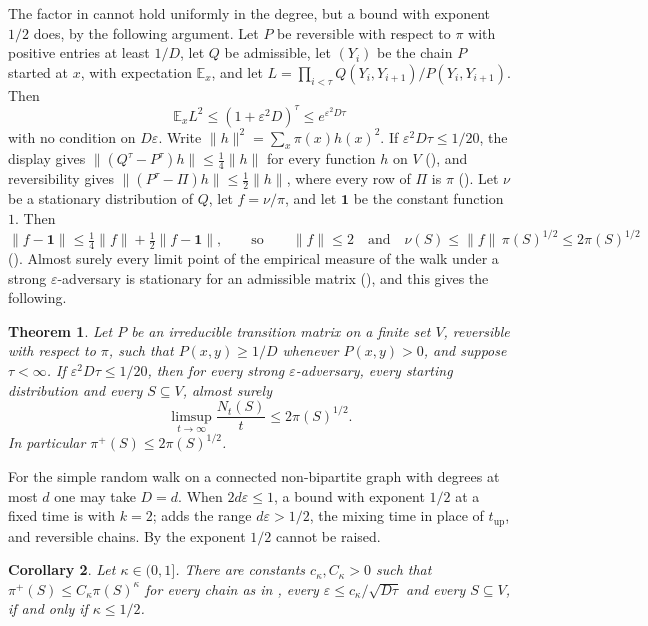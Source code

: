 \documentclass[11pt]{article}
\newtheorem{theorem}{Theorem}
\newtheorem{corollary}[theorem]{Corollary}
\theoremstyle{remark}
\theoremstyle{plain}
\newcommand{\tup}{t_{\mathrm{up}}}
\begin{document}
The factor in  cannot hold uniformly in the degree, but a bound with exponent $1/2$ does, by the following
argument.
Let $P$ be reversible with respect to $\pi$ with positive entries at least $1/D$, let $Q$ be admissible, let $(Y_i)$
be the chain $P$ started at $x$, with expectation $\mathbb E_x$, and let
$L=\prod_{i<\tau}Q(Y_i,Y_{i+1})/P(Y_i,Y_{i+1})$. Then
\[
\mathbb E_xL^2\le(1+\varepsilon^2D)^\tau\le e^{\varepsilon^2D\tau}
\]
with no condition on $D\varepsilon$. Write $\|h\|^2=\sum_x\pi(x)h(x)^2$. If $\varepsilon^2D\tau\le1/20$, the display
gives $\|(Q^\tau-P^\tau)h\|\le\frac14\|h\|$ for every function $h$ on $V$ (), and reversibility gives
$\|(P^\tau-\Pi)h\|\le\frac12\|h\|$, where every row of $\Pi$ is $\pi$ (). Let $\nu$ be a stationary
distribution of $Q$, let $f=\nu/\pi$, and let $\mathbf 1$ be the constant function $1$. Then
\[
\|f-\mathbf 1\|\le\tfrac14\|f\|+\tfrac12\|f-\mathbf 1\|,\qquad\text{so}\qquad\|f\|\le2\quad\text{and}\quad
\nu(S)\le\|f\|\,\pi(S)^{1/2}\le2\pi(S)^{1/2}
\]
(). Almost surely every limit point of the empirical measure of the walk under a strong
$\varepsilon$-adversary is stationary for an admissible matrix (), and this gives the following.

\begin{theorem}\label{thm:half}
Let $P$ be an irreducible transition matrix on a finite set $V$, reversible with respect to $\pi$, such that
$P(x,y)\ge 1/D$ whenever $P(x,y)>0$, and suppose $\tau<\infty$. If $\varepsilon^2D\tau\le 1/20$, then for every
strong $\varepsilon$-adversary, every starting distribution and every $S\subseteq V$, almost surely
\[
\limsup_{t\to\infty}\frac{N_t(S)}{t}\le 2\pi(S)^{1/2}.
\]
In particular $\pi^+(S)\le 2\pi(S)^{1/2}$.
\end{theorem}

For the simple random walk on a connected non-bipartite graph with degrees at most $d$ one may take $D=d$. When
$2d\varepsilon\le1$, a bound with exponent $1/2$ at a fixed time is \cite[Theorem~3.3]{Zu} with $k=2$;
 adds the range $d\varepsilon>1/2$, the mixing time in place of $\tup$, and reversible chains. By
 the exponent $1/2$ cannot be raised.

\begin{corollary}\label{cor:exp}
Let $\kappa\in(0,1]$. There are constants $c_\kappa,C_\kappa>0$ such that $\pi^+(S)\le C_\kappa\pi(S)^\kappa$ for
every chain as in , every $\varepsilon\le c_\kappa/\sqrt{D\tau}$ and every $S\subseteq V$, if and only
if $\kappa\le1/2$.
\end{corollary}
\end{document}
